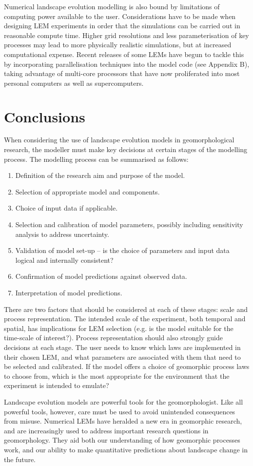 Numerical landscape evolution modelling is also bound by limitations of computing power available to the user. Considerations have to be made when designing LEM experiments in order that the simulations can be carried out in reasonable compute time. Higher grid resolutions and less parameterisation of key processes may lead to more physically realistic simulations, but at increased computational expense. Recent releases of some LEMs have begun to tackle this by incorporating parallelisation techniques into the model code (see Appendix B), taking advantage of multi-core processors that have now proliferated into most personal computers as well as supercomputers.

\section{Conclusions}
When considering the use of landscape evolution models in geomorphological research, the modeller must make key decisions at certain stages of the modelling process. The modelling process can be summarised as follows: 

\begin{enumerate}
\item Definition of the research aim and purpose of the model.
\item Selection of appropriate model and components. 
\item Choice of input data if applicable. 
\item Selection and calibration of model parameters, possibly including sensitivity analysis to address uncertainty. 
\item Validation of model set-up – is the choice of parameters and input data logical and internally consistent?
\item Confirmation of model predictions against observed data. 
\item Interpretation of model predictions. 
\end{enumerate}

There are two factors that should be considered at each of these stages: scale and process representation. The intended scale of the experiment, both temporal and spatial, has implications for LEM selection (e.g. is the model suitable for the time-scale of interest?). Process representation should also strongly guide decisions at each stage. The user needs to know which laws are implemented in their chosen LEM, and what parameters are associated with them that need to be selected and calibrated. If the model offers a choice of geomorphic process laws to choose from, which is the most appropriate for the environment that the experiment is intended to emulate? 

Landscape evolution models are powerful tools for the geomorphologist. Like all powerful tools, however, care must be used to avoid unintended consequences from misuse. Numerical LEMs have heralded a new era in geomorphic research, and are increasingly used to address important research questions in geomorphology. They aid both our understanding of how geomorphic processes work, and our ability to make quantitative predictions about landscape change in the future.

